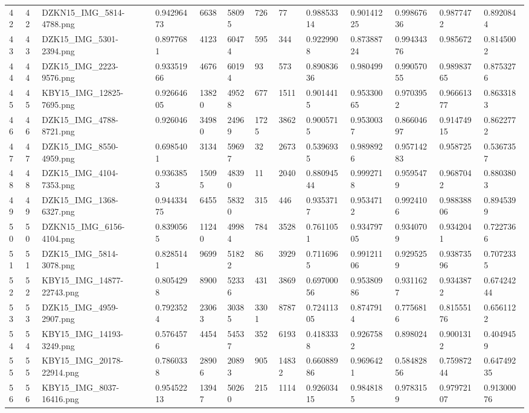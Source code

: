 \documentclass[11pt, a4paper, twoside]{report}
\begin{document}
\begin{longtable}[c]{@{}lllllllllllll@{}}
42 & 42 & DZKN15\_IMG\_5814-4788.png & 0.94296473 & 6638 & 58095 & 726 & 77 & 0.98853314 & 0.90141225 & 0.99867636 & 0.9877472 & 0.8920844 \\
43 & 43 & DZK15\_IMG\_5301-2394.png & 0.8977681 & 4123 & 60474 & 595 & 344 & 0.9229908 & 0.87388724 & 0.99434376 & 0.985672 & 0.8145002 \\
44 & 44 & DZK15\_IMG\_2223-9576.png & 0.93351966 & 4676 & 60194 & 93 & 573 & 0.89083636 & 0.980499 & 0.99057055 & 0.98983765 & 0.8753276 \\
45 & 45 & KBY15\_IMG\_12825-7695.png & 0.92664605 & 13820 & 49528 & 677 & 1511 & 0.9014415 & 0.95330065 & 0.9703952 & 0.96661377 & 0.8633183 \\
46 & 46 & DZK15\_IMG\_4788-8721.png & 0.926046 & 34980 & 24969 & 1725 & 3862 & 0.9005715 & 0.9530037 & 0.86604697 & 0.91474915 & 0.8622772 \\
47 & 47 & DZK15\_IMG\_8550-4959.png & 0.6985401 & 3134 & 59697 & 32 & 2673 & 0.5396935 & 0.9898926 & 0.95714283 & 0.958725 & 0.5367357 \\
48 & 48 & DZK15\_IMG\_4104-7353.png & 0.9363853 & 15095 & 48390 & 11 & 2040 & 0.88094544 & 0.9992718 & 0.9595479 & 0.9687042 & 0.8803803 \\
49 & 49 & DZK15\_IMG\_1368-6327.png & 0.94433475 & 6455 & 58320 & 315 & 446 & 0.9353717 & 0.9534712 & 0.9924106 & 0.98838806 & 0.8945399 \\
50 & 50 & DZKN15\_IMG\_6156-4104.png & 0.8390565 & 11240 & 49984 & 784 & 3528 & 0.7611051 & 0.93479705 & 0.9340709 & 0.9342041 & 0.7227366 \\
51 & 51 & DZK15\_IMG\_5814-3078.png & 0.8285141 & 9699 & 51822 & 86 & 3929 & 0.7116965 & 0.99121106 & 0.9295259 & 0.93873596 & 0.7072335 \\
52 & 52 & KBY15\_IMG\_14877-22743.png & 0.8054298 & 8900 & 52336 & 431 & 3869 & 0.69700056 & 0.95380986 & 0.9311627 & 0.9343872 & 0.67424244 \\
53 & 53 & DZK15\_IMG\_4959-2907.png & 0.7923524 & 23063 & 30385 & 3301 & 8787 & 0.72411305 & 0.8747914 & 0.7756816 & 0.81555176 & 0.6561122 \\
54 & 54 & KBY15\_IMG\_14193-3249.png & 0.5764576 & 4454 & 54537 & 352 & 6193 & 0.4183338 & 0.9267582 & 0.898024 & 0.9001312 & 0.4049459 \\
55 & 55 & KBY15\_IMG\_20178-22914.png & 0.7860338 & 28906 & 20893 & 905 & 14832 & 0.66088986 & 0.9696421 & 0.58482856 & 0.75987244 & 0.64749235 \\
56 & 56 & KBY15\_IMG\_8037-16416.png & 0.95452213 & 13947 & 50260 & 215 & 1114 & 0.92603415 & 0.9848185 & 0.9783159 & 0.97972107 & 0.91300076 \\

\end{longtable}
\end{document}

